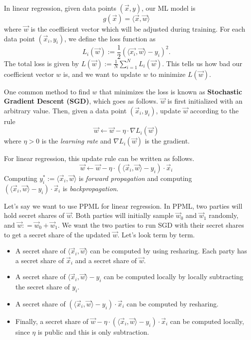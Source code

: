 In linear regression, given data points $(\vec{x}, y)$, our ML model is 
$$g(\vec{x}) = \langle \vec{x}, \vec{w}\rangle$$
where $\vec{w}$ is the coefficient vector which will be adjusted during training. For each data point $(\vec{x}_i, y_i)$, we define the loss function as 
$$L_i(\vec{w}) := \frac{1}{2}(\langle \vec{x_i}, \vec{w}\rangle - y_i)^2.$$
The total loss is given by $L(\vec{w}):= \frac{1}{N}\sum_{i = 1}^{N} L_i (\vec{w})$. This tells us how bad our coefficient vector $w$ is, and we want to update $w$ to minimize $L(\vec{w})$.

One common method to find $w$ that minimizes the loss is known as \textbf{Stochastic Gradient Descent (SGD)}, which goes as follows. $\vec{w}$ is first initialized with an arbitrary value. Then, given a data point $(\vec{x}_i, y_i)$, update $\vec{w}$ according to the rule
$$\vec{w} \gets \vec{w} - \eta \cdot \nabla L_i(\vec{w})$$
where $\eta > 0$ is the \textit{learning rate} and $\nabla L_i(\vec{w})$ is the gradient.

For linear regression, this update rule can be written as follows.
$$\vec{w} \gets \vec{w} - \eta \cdot (\langle \vec{x}_i, \vec{w}\rangle - y_i)\cdot \vec{x}_i$$
Computing $y_i^*:= \langle \vec{x}_i, \vec{w}\rangle$ is \textit{forward propagation} and computing $(\langle \vec{x}_i, \vec{w}\rangle - y_i)\cdot \vec{x}_i$ is \textit{backpropagation}.

Let's say we want to use PPML for linear regression. In PPML, two parties will hold secret shares of $\vec{w}$. Both parties will initially sample $\vec{w}_0$ and $\vec{w}_1$ randomly, and $\vec{w}: = \vec{w}_0 + \vec{w}_1$. We want the two parties to run SGD with their secret shares to get a secret share of the updated $\vec{w}$. Let's look term by term.

\begin{itemize}
    \item A secret share of $\langle \vec{x}_i, \vec{w}\rangle$ can be computed by using resharing. Each party has a secret share of $\vec{x}_i$ and a secret share of $\vec{w}$.
    \item A secret share of $\langle \vec{x}_i, \vec{w}\rangle - y_i$ can be computed locally by locally subtracting the secret share of $y_i$.
    \item A secret share of $(\langle \vec{x}_i, \vec{w}\rangle - y_i)\cdot \vec{x}_i$ can be computed by resharing.
    \item Finally, a secret share of $\vec{w} - \eta \cdot (\langle \vec{x}_i, \vec{w}\rangle - y_i)\cdot \vec{x}_i$ can be computed locally, since $\eta$ is public and this is only subtraction.
\end{itemize}

